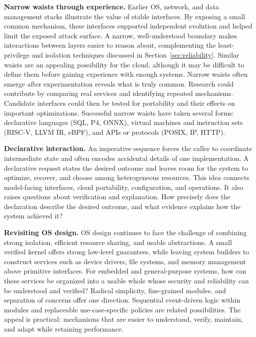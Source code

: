 \documentclass[manuscript]{acmart}
\begin{document}
\textbf{Narrow waists through experience.} Earlier OS, network, and data management stacks illustrate the value of stable interfaces.
By exposing a small common mechanism, these interfaces supported independent evolution and helped limit the exposed attack surface.
A narrow, well-understood boundary makes interactions between layers easier to reason about, complementing the least-privilege and isolation techniques discussed in Section~\ref{sec:reliability}.
Similar waists are an appealing possibility for the cloud, although it may be difficult to define them before gaining experience with enough systems.
Narrow waists often emerge after experimentation reveals what is truly common.
Research could contribute by comparing real services and identifying repeated mechanisms.
Candidate interfaces could then be tested for portability and their effects on important optimizations.
Successful narrow waists have taken several forms: declarative languages (SQL, P4, ONNX), virtual machines and instruction sets (RISC-V, LLVM IR, eBPF), and APIs or protocols (POSIX, IP, HTTP).

\textbf{Declarative interaction.}
An imperative sequence forces the caller to coordinate intermediate state and often encodes accidental details of one implementation.
A declarative request states the desired outcome and leaves room for the system to optimize, recover,
and choose among heterogeneous resources.
This idea connects model-facing interfaces, cloud portability, configuration, and operations.
It also raises questions about verification and explanation.
How precisely does the declaration describe the desired outcome, and what evidence explains how the system achieved it?

\textbf{Revisiting OS design.} OS design continues to face the challenge of combining strong isolation, efficient resource sharing, and usable abstractions.
A small verified kernel offers strong low-level guarantees, while leaving system builders to construct services such as device drivers, file systems, and memory management above primitive interfaces.
For embedded and general-purpose systems, how can these services be organized into a usable whole whose security and reliability can be understood and verified?
Radical simplicity, fine-grained modules, and separation of concerns offer one direction.
Sequential event-driven logic within modules and replaceable use-case-specific policies are related possibilities.
The appeal is practical: mechanisms that are easier to understand, verify, maintain, and adapt while retaining performance.
\end{document}
